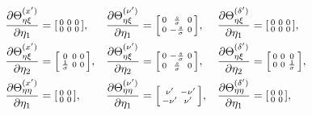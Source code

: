 \documentclass{article}
\begin{document}
\begin{align}
  \frac{\partial \Theta_{\eta\xi}^{(x')}}{\partial \eta_1}  & = \begin{bsmallmatrix} 0 & 0 & 0 \\ 0 & 0 & 0 \end{bsmallmatrix}, &  & \frac{\partial \Theta_{\eta\xi}^{(\nu')}}{\partial \eta_1} = \begin{bsmallmatrix} 0 & \frac{s}{\sigma} & 0 \\ 0 & -\frac{s}{\sigma} & 0 \end{bsmallmatrix},  &  & \frac{\partial \Theta_{\eta\xi}^{(\delta')}}{\partial \eta_1} = \begin{bsmallmatrix} 0 & 0 & 0 \\ 0 & 0 & 0 \end{bsmallmatrix}, \label{eq:third-derivative-theta-log-s-eta-xi}       \\
  \frac{\partial \Theta_{\eta\xi}^{(x')}}{\partial \eta_2}  & = \begin{bsmallmatrix} 0 & 0 & 0 \\ \frac{1}{\sigma} & 0 & 0 \end{bsmallmatrix}, &  & \frac{\partial \Theta_{\eta\xi}^{(\nu')}}{\partial \eta_2} = \begin{bsmallmatrix} 0 & -\frac{s}{\sigma} & 0 \\ 0 & \frac{s}{\sigma} & 0 \end{bsmallmatrix},  &  & \frac{\partial \Theta_{\eta\xi}^{(\delta')}}{\partial \eta_2} = \begin{bsmallmatrix} 0 & 0 & 0 \\ 0 & 0 & \frac{1}{\sigma} \end{bsmallmatrix}, \label{eq:third-derivative-theta-log-sigma-eta-xi}   \\
  \frac{\partial \Theta_{\eta\eta}^{(x')}}{\partial \eta_1} & = \begin{bsmallmatrix} 0 & 0 \\ 0 & 0 \end{bsmallmatrix}, &  & \frac{\partial \Theta_{\eta\eta}^{(\nu')}}{\partial \eta_1} = \begin{bsmallmatrix} \nu' & -\nu' \\ -\nu' & \nu' \end{bsmallmatrix}, &  & \frac{\partial \Theta_{\eta\eta}^{(\delta')}}{\partial \eta_1} = \begin{bsmallmatrix} 0 & 0 \\ 0 & 0 \end{bsmallmatrix}, \label{eq:third-derivative-theta-log-s-eta-eta}     \\

\end{align}
\end{document}
